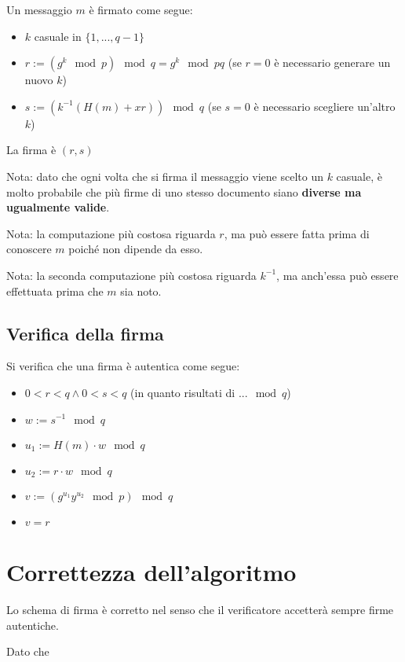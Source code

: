 \documentclass[14pt]{extarticle}
\begin{document}
    Un messaggio $m$ è firmato come segue:
    \begin{itemize}
        \item $k$ casuale in $\{1, ..., q-1\}$
        \item $r := (g^k \mod p) \mod q = g^k \mod pq$ (se $r = 0$ è necessario generare un nuovo $k$)
        \item $s := (k^{-1}(H(m) + xr)) \mod q$ (se $s = 0$ è necessario scegliere un'altro $k$)
    \end{itemize}
    La firma è $(r, s)$

    \bigskip
    Nota: dato che ogni volta che si firma il messaggio viene scelto un $k$ casuale, è molto probabile che più firme di uno stesso documento siano \textbf{diverse ma ugualmente valide}.

    \bigskip
    Nota: la computazione più costosa riguarda $r$, ma può essere fatta prima di conoscere $m$ poiché non dipende da esso.

    \bigskip
    Nota: la seconda computazione più costosa riguarda $k^{-1}$, ma anch'essa può essere effettuata prima che $m$ sia noto.

    \subsection{Verifica della firma}

    Si verifica che una firma è autentica come segue:
    \begin{itemize}
        \item $0 < r < q \wedge 0 < s < q$ (in quanto risultati di $... \mod q$)
        \item $w := s^{-1} \mod q$
        \item $u_1 := H(m) \cdot w \mod q$
        \item $u_2 := r \cdot w \mod q$
        \item $v := (g^{u_1}y^{u_2} \mod p) \mod q$
        \item $v = r$
    \end{itemize}

    \section{Correttezza dell'algoritmo}

    Lo schema di firma è corretto nel senso che il verificatore accetterà sempre firme autentiche.

    \bigskip
    Dato che
    
\end{document}
